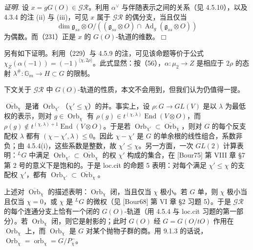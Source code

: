 
\emph{证明.} 设 $x=gG(O)\in\mathcal{GR}$。利用 $\alpha^{\vee}$ 与伴随表示之间的关系（见 4.5.10），以及 4.3.4 的注 (ii) 与 (iii)，可见 $x$ 属于 $\mathcal{GR}$ 的偶分支，当且仅当
\begin{equation}\tag{231}
\dim\mathfrak{g}_{ss}\otimes O/((\mathfrak{g}_{ss}\otimes O)\cap\operatorname{Ad}_g(\mathfrak{g}_{ss}\otimes O))
\end{equation}
为偶数。而（231）正是 $x$ 的 $G(O)$-轨道的维数。\hfill$\Box$

另有如下证明。利用（229）与 4.5.9 的注，可见该命题等价于公式 $\chi_Z(\alpha(-1))=(-1)^{\langle\chi,2\rho\rangle}$。此式显然：按（56），$\alpha:\mu_2\to Z$ 是相应于 $2\rho$ 的态射 $\lambda^{\#}:\mathbb{G}_m\to H\subset G$ 的限制。

 下文关于 $\mathcal{GR}$ 中 $G(O)$-轨道的性质，本文不会用到，但我们认为仍值得一提。

$\overline{\operatorname{Orb}}_\chi$ 是诸 $\operatorname{Orb}_{\chi'}$（$\chi'\le\chi$）的并。事实上，设 $\rho:G\to GL(V)$ 是以 $\lambda$ 为最低权的表示，则对 $g\in\operatorname{Orb}_\chi$ 有 $\rho(g)\in t^{(\chi,\lambda)}\operatorname{End}(V\otimes O)$，而 $\rho(g)\notin t^{(\chi,\lambda)+1}\operatorname{End}(V\otimes O)$。于是若 $\operatorname{Orb}_{\chi'}\subset\overline{\operatorname{Orb}}_\chi$，则对 $G$ 的每个反支配权 $\lambda$ 都有 $(\chi-\chi',\lambda)\le0$。因此 $\chi-\chi'$ 是 $G$ 的单余根的线性组合，系数非负；由 4.5.4(i)，这些系数是整数，故 $\chi'\le\chi$。另一方面，一次 $GL(2)$ 计算表明：${}^{L}G$ 中满足 $\operatorname{Orb}_{\chi'}\subset\overline{\operatorname{Orb}}_\chi$ 的权 $\chi'$ 构成的集合，在 [Bour75] 第 VIII 章 §7 第 2 号的意义下是饱和的。于是 loc.cit 的命题 5 表明：对每个满足 $\chi'\le\chi$ 的支配权 $\chi'$，都有 $\operatorname{Orb}_{\chi'}\subset\overline{\operatorname{Orb}}_\chi$。

上述对 $\overline{\operatorname{Orb}}_\chi$ 的描述表明：$\operatorname{Orb}_\chi$ 闭，当且仅当 $\chi$ 极小。若 $G$ 单，则 $\chi$ 极小当且仅当 $\chi=0$，或 $\chi$ 是 ${}^{L}G$ 的微权（见 [Bour68] 第 VI 章 §2 习题 5）。于是 $\mathcal{GR}$ 的每个连通分支上恰有一个闭的 $G(O)$-轨道（用 4.5.4 与 loc.cit 习题的第一部分）。若 $\operatorname{Orb}_\chi$ 闭，则它是射影的；此时 $G(O)$ 经 $G=G(O/tO)$ 作用在 $\operatorname{Orb}_\chi$ 上，而 $\operatorname{Orb}_\chi$ 是 $G$ 对某个抛物子群的商。用 9.1.3 的话说，$\operatorname{Orb}_\chi=\operatorname{orb}_\chi=G/P_\chi^-$。

